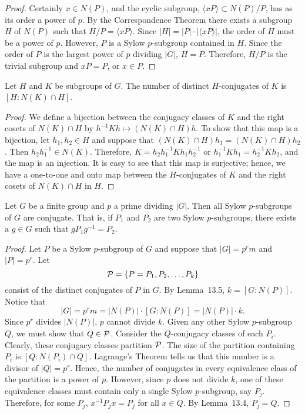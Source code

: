  
\begin{proof}
Certainly $x \in N(P)$, and the cyclic subgroup, $\langle xP \rangle
\subset N(P)/P$, has as its order a power of $p$. By the Correspondence
Theorem there exists a subgroup $H$ of $N(P)$ such that $H/P = \langle
xP \rangle$. Since $|H| = |P| \cdot |\langle xP \rangle|$, the order
of $H$ must be a power of $p$. However, $P$ is a Sylow $p$-subgroup
contained in $H$. Since the order of $P$ is the largest power of $p$
dividing $|G|$, $H=P$.  Therefore,  $H/P$ is the trivial subgroup and
$xP = P$, or $x \in P$. 
\end{proof}
 
 
\begin{lemma}
Let $H$ and $K$ be subgroups of $G$. The number of distinct
$H$-conjugates of $K$ is $[H:N(K) \cap H]$. 
\end{lemma}
 
 
\begin{proof}
We define a bijection between the conjugacy classes of $K$ and the
right cosets of $N(K) \cap H$ by $h^{-1}Kh \mapsto (N(K) \cap H)h$.
To show that this map is a bijection, let $h_1, h_2 \in H$ and suppose
that $(N(K) \cap H)h_1 = (N(K) \cap H)h_2$. Then $h_2 h_1^{-1} \in
N(K)$. Therefore, $K = h_2 h_1^{-1} K h_1 h_2^{-1}$ or $h_1^{-1} K h_1
= h_2^{-1} K h_2$, and the map is an injection.  It is easy to see
that this map is surjective; hence, we have a one-to-one and onto map
between the $H$-conjugates of $K$ and the right cosets of $N(K) \cap
H$ in $H$.
\end{proof}
 
 
\begin{theorem}
Let $G$ be a finite group and $p$ a prime dividing $|G|$. Then all
Sylow $p$-subgroups of $G$ are conjugate. That is, if $P_1$ and $P_2$
are two Sylow $p$-subgroups, there exists a $g \in G$ such that $g P_1
g^{-1} = P_2$. 
\end{theorem}
 
 
\begin{proof}
Let $P$ be a Sylow $p$-subgroup of $G$ and suppose that $|G|=p^r m$
and $|P|=p^r$. Let 
$$
{\cal P} = \{ P = P_1, P_2, \ldots, P_k \}
$$
consist of the distinct conjugates of $P$ in $G$.  By Lemma~13.5, $k =
[G: N(P)]$. Notice that 
$$
|G|= p^r m = |N(P)| \cdot [G: N(P)]= |N(P)| \cdot k.
$$
Since $p^r$ divides $|N(P)|$, $p$ cannot divide $k$. Given any other
Sylow $p$-subgroup $Q$, we must show that $Q \in {\cal P}$. Consider
the $Q$-conjugacy classes of each $P_i$. Clearly, these conjugacy
classes partition ${\cal P}$. The size of the partition containing
$P_i$ is $[Q :N(P_i) \cap Q]$. Lagrange's Theorem tells us that this
number is a divisor of $|Q|= p^r$. Hence, the number of conjugates in
every equivalence class of the partition is a power of $p$. However,
since $p$ does not divide $k$, one of these equivalence classes must
contain only a single Sylow $p$-subgroup, say $P_j$. Therefore, for
some $P_j$, $x^{-1} P_j x = P_j$ for all $x \in Q$. By Lemma~13.4,
$P_j = Q$. 
\end{proof}
 
